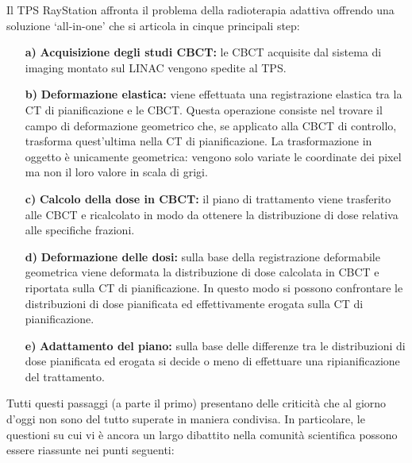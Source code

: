 Il TPS RayStation affronta il problema della radioterapia adattiva offrendo una soluzione `all-in-one' che si articola in cinque principali step:
\begin{itemize}
\item[\textbf{a)}] \textbf{Acquisizione degli studi CBCT:} le CBCT acquisite dal sistema di imaging montato sul LINAC vengono spedite al TPS.
\item[\textbf{b)}] \textbf{Deformazione elastica:} viene effettuata una registrazione elastica tra la CT di pianificazione e le CBCT. Questa operazione consiste nel trovare il campo di deformazione geometrico che, se applicato alla CBCT di controllo,   trasforma quest'ultima nella CT di pianificazione. La trasformazione in oggetto è unicamente geometrica: vengono solo variate le coordinate dei pixel ma non il loro valore in scala di grigi.
\item[\textbf{c)}] \textbf{Calcolo della dose in CBCT:} il piano di trattamento viene trasferito alle CBCT e ricalcolato in modo da ottenere la distribuzione di dose relativa alle specifiche frazioni. 
\item[\textbf{d)}] \textbf{Deformazione delle dosi:} sulla base della registrazione deformabile geometrica viene deformata la distribuzione di dose calcolata in CBCT e riportata sulla CT di pianificazione. In questo modo si possono confrontare le distribuzioni di dose pianificata ed effettivamente erogata sulla CT di pianificazione.
\item[\textbf{e)}] \textbf{Adattamento del piano:} sulla base delle differenze tra le distribuzioni di dose pianificata ed erogata si decide o meno di effettuare una ripianificazione del trattamento.
\end{itemize}

Tutti questi passaggi (a parte il primo) presentano delle criticità che al giorno d'oggi non sono del tutto superate in maniera condivisa. In particolare, le questioni su cui vi è ancora un largo dibattito nella comunità scientifica possono essere riassunte nei punti seguenti:\\

